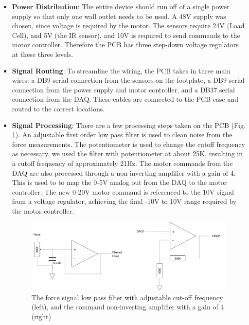 \documentclass[12pt]{report}
\begin{document}
	\begin{itemize}
	\item \textbf{Power Distribution}: The entire device should run off of a single power supply so that only one wall outlet needs to be used. A 48V supply was chosen, since voltage is required by the motor. The sensors require 24V (Load Cell), and 5V (the IR sensor), and 10V is required to send commands to the motor controller. Therefore the PCB has three step-down voltage regulators at these three levels.
	\item \textbf{Signal Routing}: To streamline the wiring, the PCB takes in three main wires: a DB9 serial connection from the sensors on the footplate, a DB9 serial connection from  the power supply and motor controller, and a DB37 serial connection from the DAQ. These cables are connected to the PCB case and routed to the correct locations.
	\item \textbf{Signal Processing}: There are a few processing steps taken on the PCB (Fig. \ref{fig:amp}). An adjustable first order low pass filter is used to clean noise from the force measurements. The potentiometer is used to change the cutoff frequency as necessary, we used the filter with potentiometer at about 25K, resulting in a cutoff frequency of approximately 21Hz. The motor commands from the DAQ are also processed through a non-inverting amplifier with a gain of 4. This is used to to map the 0-5V analog out from the DAQ to the motor controller. The new 0-20V motor command is referenced to the 10V signal from a voltage regulator, achieving the final -10V to 10V range required by the motor controller. 

	\begin{figure}[h] 
		\centering
		\includegraphics[width=\linewidth]{amplifier2}
		\caption{The force signal low pass filter with adjustable cut-off frequency (left), and the command non-inverting amplifier with a gain of 4 (right)}
		\label{fig:amp}
	\end{figure}	
	

\end{itemize}
\end{document}

